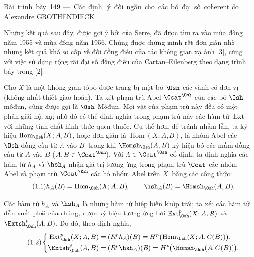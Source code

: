 \unit{Bài trình bày 149 — Các định lý đối ngẫu cho các bó đại số coherent}
%
  {do Alexandre GROTHENDIECK}

Những kết quả sau đây, được gợi ý bởi 
của Serre, đã được tìm ra vào mùa đông năm 1955 và mùa đông năm 1956. Chúng được chứng minh
rất đơn giản nhờ những kết quả khá sơ cấp về đối đồng điều của các không gian
xạ ảnh [3], cùng với việc sử dụng rộng rãi đại số đồng điều của
Cartan--Eilenberg theo dạng trình bày trong [2].


Cho $X$ là một không gian tôpô được trang bị một bó $\Osh$ các vành có đơn vị
(không nhất thiết giao hoán). Ta xét phạm trù Abel
$\Ccat^{\Osh}$ của các bó $\Osh$-môđun, cũng được gọi là $\Osh$-Môđun.
Mọi vật của phạm trù này đều có một phân giải nội xạ; nhờ đó
có thể định nghĩa trong phạm trù này các hàm tử $\operatorname{Ext}$ với những tính chất
hình thức quen thuộc. Cụ thể hơn, để tránh nhầm lẫn, ta
ký hiệu $\operatorname{Hom}_{\Osh}(X;A,B)$, hoặc đơn giản là
$\operatorname{Hom}(X;A,B)$, là nhóm Abel các $\Osh$-đồng cấu từ $A$
vào $B$, trong khi $\Homsh_{\Osh}(A,B)$ ký hiệu bó các mầm
đồng cấu từ $A$ vào $B$ ($A,B\in\Ccat^{\Osh}$). Với
$A\in\Ccat^{\Osh}$ cố định, ta định nghĩa các hàm tử $h_A$ và $\hsh_A$ nhận giá trị tương ứng
trong phạm trù $\Ccat$ các nhóm Abel và phạm trù
$\Ccat^{\Zsh}$ các bó nhóm Abel trên $X$, bằng các công thức:
\begin{equation}\tag{1.1}
  h_A(B)=\operatorname{Hom}_{\Osh}(X;A,B),
  \qquad
  \hsh_A(B)=\Homsh_{\Osh}(A,B).
\end{equation}

Các hàm tử $h_A$ và $\hsh_A$ là những hàm tử hiệp biến khớp trái;
ta xét các hàm tử dẫn xuất phải của chúng, được ký hiệu tương ứng bởi
$\operatorname{Ext}_{\Osh}^{p}(X;A,B)$ và $\Extsh_{\Osh}^{p}(A,B)$. Do đó,
theo định nghĩa,
\begin{equation}\tag{1.2}
\left\{
\begin{aligned}
\operatorname{Ext}_{\Osh}^{p}(X;A,B)
  &= (R^{p}h_A)(B)
   = H^{p}\bigl(\operatorname{Hom}_{\Osh}(X;A,C(B))\bigr),\\
\Extsh_{\Osh}^{p}(A,B)
  &= (R^{p}\hsh_A)(B)
   = H^{p}\bigl(\Homsh_{\Osh}(A,C(B))\bigr),
\end{aligned}
\right.
\end{equation}


